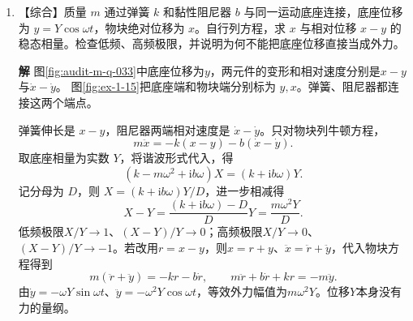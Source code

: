 \documentclass[11pt,openany,fontset=fandol]{ctexbook}
\theoremstyle{plain}\newtheorem{theorem}{定理}[chapter]\newtheorem{proposition}[theorem]{命题}
\theoremstyle{definition}\newtheorem{definition}{定义}[chapter]\newtheorem{example}{例}[chapter]
\theoremstyle{remark}\newtheorem*{remark}{说明}
\newcommand{\SolutionStart}{\par\nobreak\medskip\nobreak\noindent\textbf{解}\quad\ignorespaces}
\newenvironment{solution}{\SolutionStart}{\par\medskip}
\newcommand{\dd}{\mathop{}\!\mathrm d}\newcommand{\ii}{\mathrm i}\newcommand{\ee}{\mathrm e}
\begin{document}
\begin{enumerate}[label=1.\arabic*]
\begin{solution}
先设 $a\ne b$，令部分分式系数满足
\[
\frac1{(x^2+a^2)(x^2+b^2)}
=\frac A{x^2+a^2}+\frac B{x^2+b^2}.
\]
比较分子得 $A+B=0$、$Ab^2+Ba^2=1$，故 $A=1/(b^2-a^2)$、$B=-A$。使用 $\int_{-\infty}^{\infty}\dd x/(x^2+a^2)=\pi/a$，积分为
\[
\frac{\pi/a-\pi/b}{b^2-a^2}=\frac\pi{ab(a+b)}.
\]
当 $a=b$ 时，部分分式中出现的零分母只表示该分解不再适用；原积分仍存在。由二阶极点结果得 $\pi/(2a^3)$，也等于上述最终式令 $b\to a$ 的极限。参数取固定正值附近时有可积控制，因此该连续衔接合法。

\begin{figure}[H]\centering
{}
\caption{题1.14解图：示意取 $a<b$；反序时两标记交换，闭路结论不变。分式拆分与参数合并极限对应两种局部极点结构。}\label{fig:hw-1-14}
\end{figure}

当 $b\to a$，两简单分式的系数发散而积分组合仍有有限极限；原函数的极点合并成二阶极点，与例1.14对应。
\end{solution}

\item \begin{minipage}[t]{\linewidth}
【综合】质量 $m$ 通过弹簧 $k$ 和黏性阻尼器 $b$ 与同一运动底座连接，底座位移为 $y=Y\cos\omega t$，物块绝对位移为 $x$。自行列方程，求 $x$ 与相对位移 $x-y$ 的稳态相量。检查低频、高频极限，并说明为何不能把底座位移直接当成外力。

\end{minipage}

\begin{solution}
图\ref{fig:audit-m-q-033}中底座位移为$y$，两元件的变形和相对速度分别是$x-y$与$\dot x-\dot y$。
图\ref{fig:ex-1-15}把底座端和物块端分别标为 $y,x$。弹簧、阻尼器都连接这两个端点。

弹簧伸长是 $x-y$，阻尼器两端相对速度是 $\dot x-\dot y$。只对物块列牛顿方程，
\[
m\ddot x=-k(x-y)-b(\dot x-\dot y).
\]
取底座相量为实数 $Y$，将谐波形式代入，得
\[
(k-m\omega^2+\ii b\omega)X=(k+\ii b\omega)Y.
\]
记分母为 $D$，则 $X=(k+\ii b\omega)Y/D$，进一步相减得
\[
X-Y=\frac{(k+\ii b\omega)-D}{D}Y
=\frac{m\omega^2Y}{D}.
\]
低频极限$X/Y\to1$、$(X-Y)/Y\to0$；高频极限$X/Y\to0$、$(X-Y)/Y\to-1$。若改用$r=x-y$，则$x=r+y$、$\ddot x=\ddot r+\ddot y$，代入物块方程得到
\[m(\ddot r+\ddot y)=-kr-b\dot r,
\qquad m\ddot r+b\dot r+kr=-m\ddot y.\]
由$\dot y=-\omega Y\sin\omega t$、$\ddot y=-\omega^2Y\cos\omega t$，等效外力幅值为$m\omega^2Y$。位移$Y$本身没有力的量纲。


\end{solution}
\end{enumerate}
\end{document}
